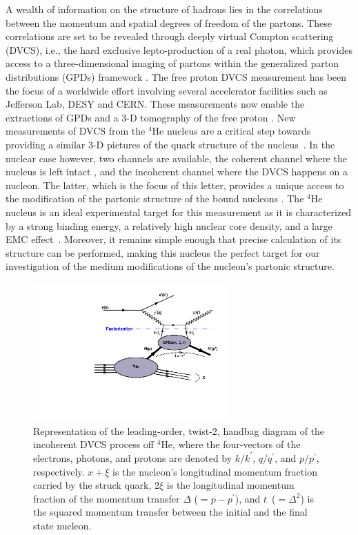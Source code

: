 \documentclass[twocolumn,nofootinbib,showpacs,prl,superscriptaddress,secnumarabic,amssymb,nobibnotes,aps,floatfix]{revtex4}
\begin{document}
A wealth of information on the structure of hadrons lies in the correlations 
between the momentum and spatial degrees of freedom of the partons. These 
correlations are set to be revealed through deeply virtual Compton scattering 
(DVCS), i.e., the hard exclusive lepto-production of a real photon, which 
provides access to a three-dimensional imaging of partons within the 
generalized parton distributions (GPDs) framework 
\cite{Mueller:1998fv,Ji:1996ek,Ji:1996nm,Radyushkin:1996nd,Radyushkin:1997ki}.   
The free proton DVCS measurement has been the focus of a worldwide effort 
\cite{Stepanyan:2001sm,Airapetian:2001yk,Airapetian:2006zr,Chekanov:2003ya,Aktas:2005ty,Chen:2006na,Munoz 
Camacho:2006hx,Girod:2007aa,Mazouz:2007aa,Gavalian:2009,Seder:2015,Pisano:2015,Jo:2015ema}
involving several accelerator facilities such as Jefferson Lab, DESY and  
CERN. These measurements now enable the extractions of GPDs 
and a 3-D tomography of the free proton \cite{Guidal:2013rya,Dupre:2016mai}.  
New measurements of DVCS from the $^{4}$He nucleus are a critical 
step towards providing a similar 3-D pictures of the quark structure of the 
nucleus~\cite{Dupre:2015jha}. In the nuclear case however, two channels are available,
the coherent channel where the nucleus is left intact \cite{Airapetian:2009cga,
Hattawy:2017woc}, and the incoherent channel where the DVCS happens on a nucleon.
The latter, which is the focus of this letter, provides a unique access to the 
modification of the partonic structure of the bound nucleons 
\cite{simonetta_2,Guzey:2006xi,Guzey:2008fe}. The 
$^{4}$He nucleus is an ideal experimental target for this measurement as it is 
characterized by a strong binding energy, a relatively high nuclear 
core density, and a large EMC effect~\cite{JSeely}. Moreover, it remains simple 
enough that precise calculation of its structure 
can be performed, making this nucleus the perfect target for our investigation of the 
medium modifications of the nucleon's partonic structure. 


\begin{figure}[tb]
\includegraphics[width=7.5cm]{figs/handbag_incoherent.pdf}
\caption{Representation of the leading-order, twist-2, handbag diagram of the 
   incoherent DVCS process off $^4$He, where the four-vectors of the electrons, 
   photons, and protons are denoted by $k/k^\prime$, $q/q^\prime$, and 
   $p/p^\prime$, respectively. $x+\xi$ is the nucleon’s longitudinal momentum 
   fraction carried by the struck quark, 2$\xi$ is the longitudinal momentum 
   fraction of the momentum transfer $\Delta$ ($= p - p^\prime$), and 
   $t$~($=\Delta^2$) is the squared momentum transfer between the initial and
   the final state nucleon.}
\label{fig:diags}
\end{figure}
\end{document}
